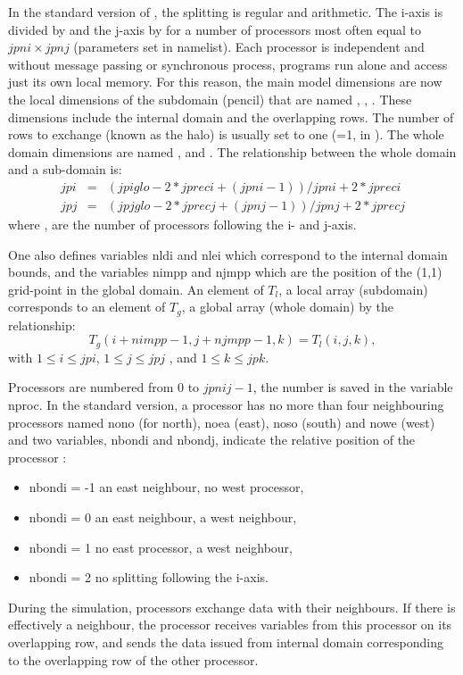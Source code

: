 \documentclass[../tex_main/NEMO_manual]{subfiles}
\begin{document}
In the standard version of \NEMO, the splitting is regular and arithmetic.
The i-axis is divided by  and the j-axis by  for a number of processors 
 most often equal to $jpni \times jpnj$ (parameters set in 
  namelist). Each processor is independent and without message passing 
 or synchronous process, programs run alone and access just its own local memory. 
 For this reason, the main model dimensions are now the local dimensions of the subdomain (pencil) 
 that are named , , . These dimensions include the internal 
 domain and the overlapping rows. The number of rows to exchange (known as 
 the halo) is usually set to one (=1, in ). The whole domain 
 dimensions are named ,  and . The relationship between 
 the whole domain and a sub-domain is:
\begin{eqnarray} 
      jpi & = & ( jpiglo-2*jpreci + (jpni-1) ) / jpni + 2*jpreci  \nonumber \\
      jpj & = & ( jpjglo-2*jprecj + (jpnj-1) ) / jpnj + 2*jprecj  \label{eq:lbc_jpi}
\end{eqnarray}
where ,  are the number of processors following the i- and j-axis.

One also defines variables nldi and nlei which correspond to the internal domain bounds, 
and the variables nimpp and njmpp which are the position of the (1,1) grid-point in the global domain. 
An element of $T_{l}$, a local array (subdomain) corresponds to an element of $T_{g}$, 
a global array (whole domain) by the relationship: 
\begin{equation} \label{eq:lbc_nimpp}
T_{g} (i+nimpp-1,j+njmpp-1,k) = T_{l} (i,j,k),
\end{equation}
with  $1 \leq i \leq jpi$, $1  \leq j \leq jpj $ , and  $1  \leq k \leq jpk$.

Processors are numbered from 0 to $jpnij-1$, the number is saved in the variable 
nproc. In the standard version, a processor has no more than four neighbouring 
processors named nono (for north), noea (east), noso (south) and nowe (west) 
and two variables, nbondi and nbondj, indicate the relative position of the processor :
\begin{itemize}
\item 		nbondi = -1 	an east neighbour, no west processor,
\item 		nbondi =  0	an east neighbour, a west neighbour,
\item 		nbondi =  1 	no east processor, a west neighbour,
\item 		nbondi =  2 	no splitting following the i-axis.
\end{itemize}
During the simulation, processors exchange data with their neighbours. 
If there is effectively a neighbour, the processor receives variables from this 
processor on its overlapping row, and sends the data issued from internal 
domain corresponding to the overlapping row of the other processor.
\end{document}
